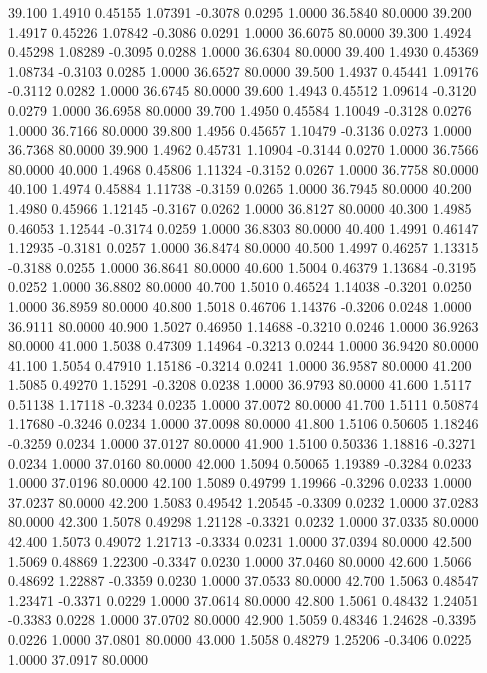   39.100   1.4910   0.45155   1.07391  -0.3078   0.0295   1.0000  36.5840  80.0000
  39.200   1.4917   0.45226   1.07842  -0.3086   0.0291   1.0000  36.6075  80.0000
  39.300   1.4924   0.45298   1.08289  -0.3095   0.0288   1.0000  36.6304  80.0000
  39.400   1.4930   0.45369   1.08734  -0.3103   0.0285   1.0000  36.6527  80.0000
  39.500   1.4937   0.45441   1.09176  -0.3112   0.0282   1.0000  36.6745  80.0000
  39.600   1.4943   0.45512   1.09614  -0.3120   0.0279   1.0000  36.6958  80.0000
  39.700   1.4950   0.45584   1.10049  -0.3128   0.0276   1.0000  36.7166  80.0000
  39.800   1.4956   0.45657   1.10479  -0.3136   0.0273   1.0000  36.7368  80.0000
  39.900   1.4962   0.45731   1.10904  -0.3144   0.0270   1.0000  36.7566  80.0000
  40.000   1.4968   0.45806   1.11324  -0.3152   0.0267   1.0000  36.7758  80.0000
  40.100   1.4974   0.45884   1.11738  -0.3159   0.0265   1.0000  36.7945  80.0000
  40.200   1.4980   0.45966   1.12145  -0.3167   0.0262   1.0000  36.8127  80.0000
  40.300   1.4985   0.46053   1.12544  -0.3174   0.0259   1.0000  36.8303  80.0000
  40.400   1.4991   0.46147   1.12935  -0.3181   0.0257   1.0000  36.8474  80.0000
  40.500   1.4997   0.46257   1.13315  -0.3188   0.0255   1.0000  36.8641  80.0000
  40.600   1.5004   0.46379   1.13684  -0.3195   0.0252   1.0000  36.8802  80.0000
  40.700   1.5010   0.46524   1.14038  -0.3201   0.0250   1.0000  36.8959  80.0000
  40.800   1.5018   0.46706   1.14376  -0.3206   0.0248   1.0000  36.9111  80.0000
  40.900   1.5027   0.46950   1.14688  -0.3210   0.0246   1.0000  36.9263  80.0000
  41.000   1.5038   0.47309   1.14964  -0.3213   0.0244   1.0000  36.9420  80.0000
  41.100   1.5054   0.47910   1.15186  -0.3214   0.0241   1.0000  36.9587  80.0000
  41.200   1.5085   0.49270   1.15291  -0.3208   0.0238   1.0000  36.9793  80.0000
  41.600   1.5117   0.51138   1.17118  -0.3234   0.0235   1.0000  37.0072  80.0000
  41.700   1.5111   0.50874   1.17680  -0.3246   0.0234   1.0000  37.0098  80.0000
  41.800   1.5106   0.50605   1.18246  -0.3259   0.0234   1.0000  37.0127  80.0000
  41.900   1.5100   0.50336   1.18816  -0.3271   0.0234   1.0000  37.0160  80.0000
  42.000   1.5094   0.50065   1.19389  -0.3284   0.0233   1.0000  37.0196  80.0000
  42.100   1.5089   0.49799   1.19966  -0.3296   0.0233   1.0000  37.0237  80.0000
  42.200   1.5083   0.49542   1.20545  -0.3309   0.0232   1.0000  37.0283  80.0000
  42.300   1.5078   0.49298   1.21128  -0.3321   0.0232   1.0000  37.0335  80.0000
  42.400   1.5073   0.49072   1.21713  -0.3334   0.0231   1.0000  37.0394  80.0000
  42.500   1.5069   0.48869   1.22300  -0.3347   0.0230   1.0000  37.0460  80.0000
  42.600   1.5066   0.48692   1.22887  -0.3359   0.0230   1.0000  37.0533  80.0000
  42.700   1.5063   0.48547   1.23471  -0.3371   0.0229   1.0000  37.0614  80.0000
  42.800   1.5061   0.48432   1.24051  -0.3383   0.0228   1.0000  37.0702  80.0000
  42.900   1.5059   0.48346   1.24628  -0.3395   0.0226   1.0000  37.0801  80.0000
  43.000   1.5058   0.48279   1.25206  -0.3406   0.0225   1.0000  37.0917  80.0000
